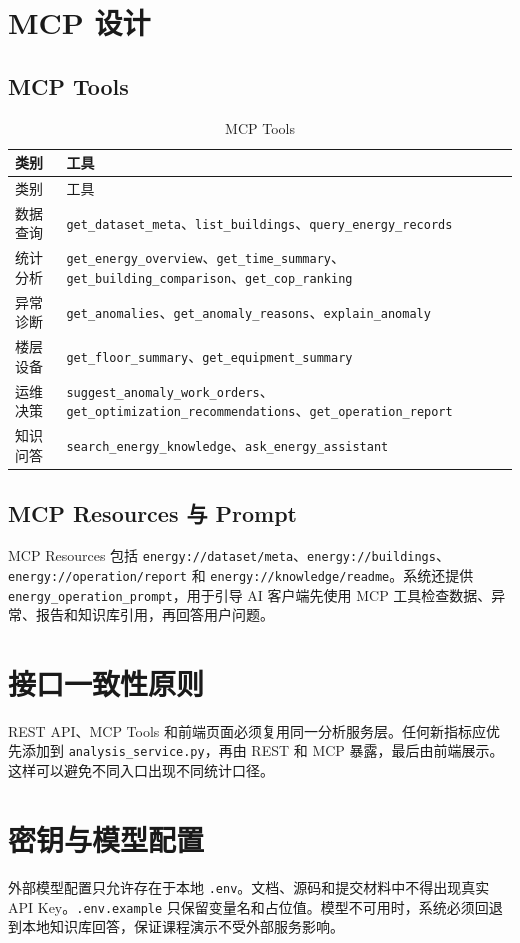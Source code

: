 \documentclass[12pt,a4paper]{ctexart}
\newcommand{\code}[1]{{\footnotesize\nolinkurl{#1}}}
\begin{document}
\section{MCP 设计}
\subsection{MCP Tools}
\begin{longtable}{p{4cm}p{9.8cm}}
\caption{MCP Tools}\\
\toprule
类别 & 工具 \\
\midrule
\endfirsthead
\toprule
类别 & 工具 \\
\midrule
\endhead
数据查询 & \code{get_dataset_meta}、\code{list_buildings}、\code{query_energy_records} \\
统计分析 & \code{get_energy_overview}、\code{get_time_summary}、\code{get_building_comparison}、\code{get_cop_ranking} \\
异常诊断 & \code{get_anomalies}、\code{get_anomaly_reasons}、\code{explain_anomaly} \\
楼层设备 & \code{get_floor_summary}、\code{get_equipment_summary} \\
运维决策 & \code{suggest_anomaly_work_orders}、\code{get_optimization_recommendations}、\code{get_operation_report} \\
知识问答 & \code{search_energy_knowledge}、\code{ask_energy_assistant} \\
\bottomrule
\end{longtable}

\subsection{MCP Resources 与 Prompt}
MCP Resources 包括 \code{energy://dataset/meta}、\code{energy://buildings}、\code{energy://operation/report} 和 \code{energy://knowledge/readme}。系统还提供 \code{energy_operation_prompt}，用于引导 AI 客户端先使用 MCP 工具检查数据、异常、报告和知识库引用，再回答用户问题。

\section{接口一致性原则}
REST API、MCP Tools 和前端页面必须复用同一分析服务层。任何新指标应优先添加到 \code{analysis_service.py}，再由 REST 和 MCP 暴露，最后由前端展示。这样可以避免不同入口出现不同统计口径。

\section{密钥与模型配置}
外部模型配置只允许存在于本地 \code{.env}。文档、源码和提交材料中不得出现真实 API Key。\code{.env.example} 只保留变量名和占位值。模型不可用时，系统必须回退到本地知识库回答，保证课程演示不受外部服务影响。
\end{document}
